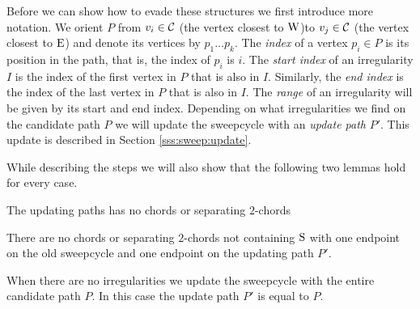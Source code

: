   Before we can show how to evade these structures we first introduce more notation. We orient $P$ from $v_i \in \mathcal{C}$ (the vertex closest to $\mathrm{W}$)to $v_j \in \mathcal{C}$ (the vertex closest to $\mathrm{E}$) and denote its vertices by $p_1 \ldots p_k$.
  The \emph{index} of a vertex $p_i \in P$ is its position in the path, that is, the index of $p_i$ is $i$.
  The \emph{start index} of an irregularity $I$ is the index of the first vertex in $P$ that is also in $I$. Similarly, the \emph{end index} is the index of the last vertex in $P$ that is also in $I$.
  The \emph{range} of an irregularity will be given by its start and end index. Depending on what irregularities we find on the candidate path $P$ we will update the sweepcycle with an \emph{update path} $P'$. This update is described in Section \ref{sss:sweep:update}.

  While describing the steps we will also show that the following two lemmas hold for every case.

  \begin{lemma}
    The updating paths has no chords or separating $2$-chords
    \label{lm:sweep:augNoIregularity}
  \end{lemma}

  \begin{lemma}
    \label{lm:sweep:noConnectingIregularity}
    There are no chords or separating $2$-chords not containing $\mathrm{S}$ with one endpoint on the old sweepcycle and one endpoint on the updating path $P'$.
  \end{lemma}

    When there are no irregularities we update the sweepcycle with the entire candidate path $P$.
    In this case the update path $P'$ is equal to $P$.

